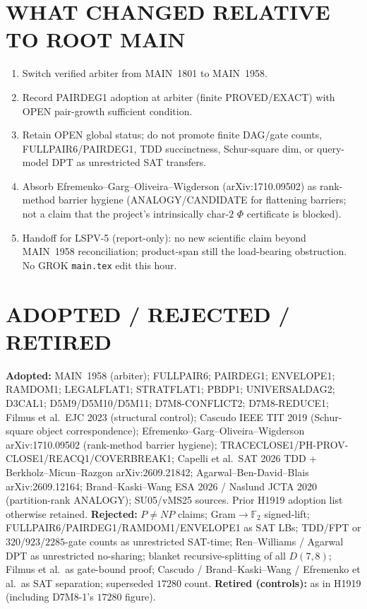\documentclass[11pt]{article}
\begin{document}
\section*{WHAT CHANGED RELATIVE TO ROOT MAIN}
\begin{enumerate}
\item Switch verified arbiter from MAIN~1801 to MAIN~1958.
\item Record PAIRDEG1 adoption at arbiter (finite PROVED/EXACT) with OPEN
pair-growth sufficient condition.
\item Retain OPEN global status; do not promote finite DAG/gate counts,
FULLPAIR6/PAIRDEG1, TDD succinctness, Schur-square dim, or query-model DPT as
unrestricted SAT transfers.
\item Absorb Efremenko--Garg--Oliveira--Wigderson (arXiv:1710.09502) as
rank-method barrier hygiene (ANALOGY/CANDIDATE for flattening barriers; not a
claim that the project's intrinsically char-$2$ $\Phi$ certificate is blocked).
\item Handoff for LSPV-5 (report-only): no new scientific claim beyond MAIN~1958
reconciliation; product-span still the load-bearing obstruction. No GROK
\texttt{main.tex} edit this hour.
\end{enumerate}

\section*{ADOPTED / REJECTED / RETIRED}
\textbf{Adopted:} MAIN~1958 (arbiter); FULLPAIR6; PAIRDEG1; ENVELOPE1; RAMDOM1;
LEGALFLAT1; STRATFLAT1; PBDP1; UNIVERSALDAG2; D3CAL1; D5M9/D5M10/D5M11;
D7M8-CONFLICT2; D7M8-REDUCE1; Filmus et al.\ EJC 2023 (structural control);
Cascudo IEEE TIT 2019 (Schur-square object correspondence);
Efremenko--Garg--Oliveira--Wigderson arXiv:1710.09502 (rank-method barrier
hygiene); TRACECLOSE1/PH-PROV-CLOSE1/REACQ1/COVERBREAK1; Capelli et al.\ SAT 2026
TDD + Berkholz--Micun--Razgon arXiv:2609.21842; Agarwal--Ben-David--Blais
arXiv:2609.12164; Brand--Kaski--Wang ESA 2026 / Naslund JCTA 2020 (partition-rank
ANALOGY); SU05/vMS25 sources. Prior H1919 adoption list otherwise retained.
\textbf{Rejected:} $P\neq NP$ claims; Gram$\to\mathbb F_2$ signed-lift;
FULLPAIR6/PAIRDEG1/RAMDOM1/ENVELOPE1 as SAT LBs; TDD/FPT or $320$/$923$/$2285$-gate
counts as unrestricted SAT-time; Ren--Williams / Agarwal DPT as unrestricted
no-sharing; blanket recursive-splitting of all $D(7,8)$; Filmus et al.\ as
gate-bound proof; Cascudo / Brand--Kaski--Wang / Efremenko et al.\ as SAT
separation; superseded $17280$ count.
\textbf{Retired (controls):} as in H1919 (including D7M8-1's $17280$ figure).
\end{document}
